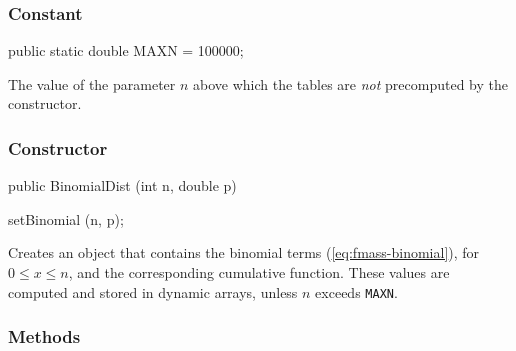 \unmoved\begin{detailed}
\subsubsection* {Constant}
\begin{code}
   public static double MAXN = 100000;
\end{code}
 \begin{tabb} The value of the parameter $n$ above which
              the tables are {\em not\/} precomputed by
              the constructor.
 \end{tabb}

\end{detailed}

\subsubsection* {Constructor}
\begin{code}

   public BinomialDist (int n, double p)\begin{hide} {
      setBinomial (n, p);
   }\end{hide}
\end{code}
\begin{tabb} Creates an object that contains the binomial terms
   (\ref{eq:fmass-binomial}), for $0\le x\le n$, and the corresponding
   cumulative function.
   These values are computed and stored in dynamic arrays, unless
   $n$ exceeds \texttt{MAXN}.
\end{tabb}
\subsubsection* {Methods}

